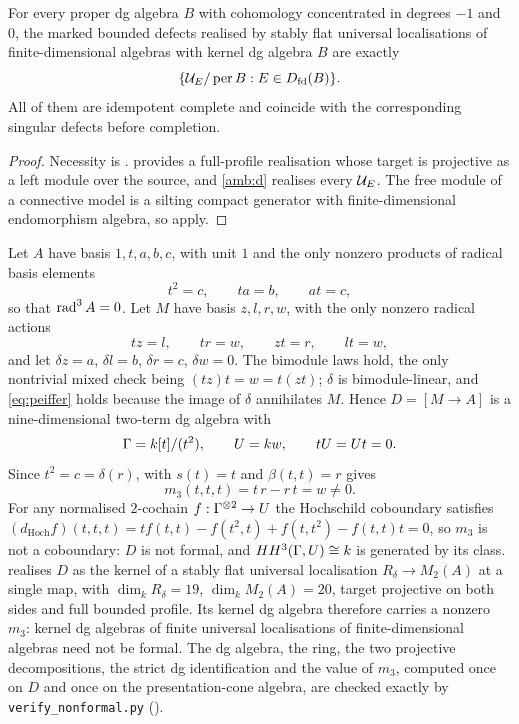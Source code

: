 \begin{corollary}\label{cor:thin-all-profiles}
For every proper dg algebra \(B\) with cohomology concentrated in degrees \(-1\) and \(0\), the marked bounded defects realised by stably flat universal localisations of finite-dimensional algebras with kernel dg algebra \(B\) are exactly
\[
 \{\mathcal U_E/\operatorname{per} B:E\in D_{\mathrm{fd}}(B)\}.
\]
All of them are idempotent complete and coincide with the corresponding singular defects before completion.
\end{corollary}

\begin{proof}
Necessity is .   provides a full-profile realisation whose target is projective as a left module over the source, and \ref{amb:d} realises every \(\mathcal U_E\).  The free module of a connective model is a silting compact generator with finite-dimensional endomorphism algebra, so  apply.
\end{proof}

\begin{example}\label{ex:nonformal}
Let \(A\) have basis \(1,t,a,b,c\), with unit \(1\) and the only nonzero products of radical basis elements
\[
 t^2=c,\qquad ta=b,\qquad at=c,
\]
so that \(\operatorname{rad}^3A=0\).  Let \(M\) have basis \(z,l,r,w\), with the only nonzero radical actions
\[
 tz=l,\qquad tr=w,\qquad zt=r,\qquad lt=w,
\]
and let \(\delta z=a\), \(\delta l=b\), \(\delta r=c\), \(\delta w=0\).  The bimodule laws hold, the only nontrivial mixed check being \((tz)t=w=t(zt)\); \(\delta\) is bimodule-linear, and \eqref{eq:peiffer} holds because the image of \(\delta\) annihilates \(M\).  Hence \(D=[M\to A]\) is a nine-dimensional two-term dg algebra with
\[
 \Gamma=k[t]/(t^2),\qquad U=kw,\qquad tU=Ut=0 .
\]
Since \(t^2=c=\delta(r)\),  with \(s(t)=t\) and \(\beta(t,t)=r\) gives
\[
 m_3(t,t,t)=t\,r-r\,t=w\ne0 .
\]
For any normalised \(2\)-cochain \(f:\Gamma^{\otimes2}\to U\) the Hochschild coboundary satisfies \((d_{\mathrm{Hoch}}f)(t,t,t)=tf(t,t)-f(t^2,t)+f(t,t^2)-f(t,t)t=0\), so \(m_3\) is not a coboundary: \(D\) is not formal, and \(HH^3(\Gamma,U)\cong k\) is generated by its class.   realises \(D\) as the kernel of a stably flat universal localisation \(R_\delta\to M_2(A)\) at a single map, with \(\dim_kR_\delta=19\), \(\dim_kM_2(A)=20\), target projective on both sides and full bounded profile.  Its kernel dg algebra therefore carries a nonzero \(m_3\): kernel dg algebras of finite universal localisations of finite-dimensional algebras need not be formal.  The dg algebra, the ring, the two projective decompositions, the strict dg identification and the value of \(m_3\), computed once on \(D\) and once on the presentation-cone algebra, are checked exactly by \texttt{verify\_nonformal.py} ().
\end{example}

